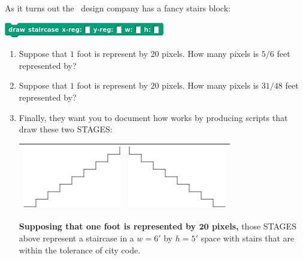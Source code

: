 \documentclass[noauthor,nooutcomes,12pt,hints,handout]{ximera}
\begin{document}
\begin{question}%
  As it turns out the \mooculus\ design company has a fancy stairs
  block:
  \begin{center}
  \includegraphics{drawStaircaseBlockBlank.png}
  \end{center}
  \begin{enumerate}
    \item Suppose that $1$ foot is represent by $20$ pixels. How many
      pixels is $5/6$ feet represented by?
    \item Suppose that $1$ foot is represent by $20$ pixels. How many
      pixels is $31/48$ feet represented by?
    \item Finally, they want you to document how
       works
      by producing scripts that draw these two STAGES:
      \begin{center}
        \begin{tabular}{|c||c|}\hline
          \includegraphics{fwdStairStage.png} & \includegraphics{backStairStage.png} \\ \hline
        \end{tabular}
      \end{center}
      \textbf{Supposing that one foot is represented by $\boldsymbol{20}$
        pixels,} those STAGES above represent a staircase in a $w=6'$ by
      $h=5'$ space with stairs that are within the tolerance of city
      code.
      

\end{enumerate}
\end{question}
\end{document}
